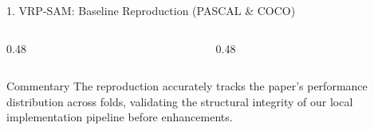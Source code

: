 \documentclass[aspectratio=169, 10pt]{beamer}
\begin{document}
\begin{frame}{1. VRP-SAM: Baseline Reproduction (PASCAL \& COCO)}
    \begin{columns}[T]
        \begin{column}{0.48\textwidth}
            \begin{table}
                \caption{PASCAL-$5^i$ Reproduction (ResNet-50)}
            \end{table}
        \end{column}
        
        \begin{column}{0.48\textwidth}
            \begin{table}
                \caption{COCO-$20^i$ Reproduction (ResNet-50, Mask)}
            \end{table}
        \end{column}
    \end{columns}

    \vspace{0.3cm}
    \begin{alertblock}{Commentary}
        \footnotesize The reproduction accurately tracks the paper's performance distribution across folds, validating the structural integrity of our local implementation pipeline before enhancements.
    \end{alertblock}
\end{frame}
\end{document}
